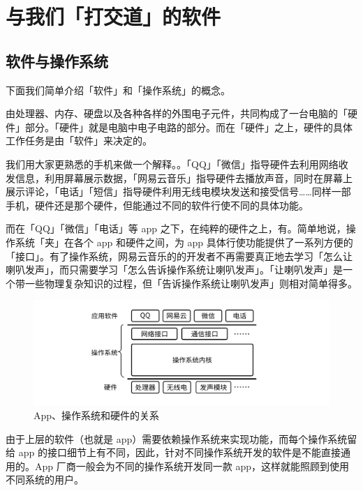 \section{与我们「打交道」的软件}

\subsection{软件与操作系统}

下面我们简单介绍「软件」和「操作系统」的概念。

由处理器、内存、硬盘以及各种各样的外围电子元件，共同构成了一台电脑的「硬件」部分。「硬件」就是电脑中电子电路的部分。而在「硬件」之上，硬件的具体工作任务是由「软件」来决定的。

我们用大家更熟悉的手机来做一个解释。。「QQ」「微信」指导硬件去利用网络收发信息，利用屏幕展示数据，「网易云音乐」指导硬件去播放声音，同时在屏幕上展示评论，「电话」「短信」指导硬件利用无线电模块发送和接受信号……同样一部手机，硬件还是那个硬件，但能通过不同的软件行使不同的具体功能。

而在「QQ」「微信」「电话」等 app 之下，在纯粹的硬件之上，有。简单地说，操作系统「夹」在各个 app 和硬件之间，为 app 具体行使功能提供了一系列方便的「接口」。有了操作系统，网易云音乐的的开发者不再需要真正地去学习「怎么让喇叭发声」，而只需要学习「怎么告诉操作系统让喇叭发声」。「让喇叭发声」是一个带一些物理复杂知识的过程，但「告诉操作系统让喇叭发声」则相对简单得多。

\begin{figure}[H]
  \centering
  \includegraphics[width=13cm]{assets/Computer_Structure.png}
  \caption{App、操作系统和硬件的关系}
  \label{computer-structure}
\end{figure}

由于上层的软件（也就是 app）需要依赖操作系统来实现功能，而每个操作系统留给 app 的接口细节上有不同，因此，针对不同操作系统开发的软件是不能直接通用的。App 厂商一般会为不同的操作系统开发同一款 app，这样就能照顾到使用不同系统的用户。

